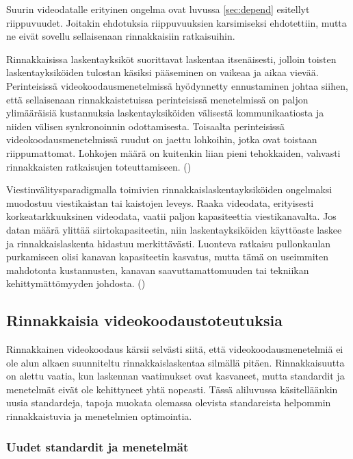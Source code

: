 Suurin videodatalle erityinen ongelma ovat luvussa \ref{sec:depend} esitellyt riippuvuudet.
Joitakin ehdotuksia riippuvuuksien
karsimiseksi ehdotettiin, mutta ne eivät sovellu sellaisenaan rinnakkaisiin
ratkaisuihin. 

Rinnakkaisissa laskentayksiköt suorittavat laskentaa itsenäisesti, jolloin
toisten laskentayksiköiden tulostan käsiksi pääseminen on vaikeaa ja
aikaa vievää. Perinteisissä videokoodausmenetelmissä hyödynnetty ennustaminen
johtaa siihen, että sellaisenaan rinnakkaistetuissa perinteisissä menetelmissä
on paljon ylimääräisiä kustannuksia laskentayksiköiden välisestä
kommunikaatiosta ja niiden välisen synkronoinnin odottamisesta. Toisaalta
perinteisissä videokoodausmenetelmissä ruudut on jaettu lohkoihin, jotka ovat
toistaan riippumattomat. Lohkojen määrä on kuitenkin liian pieni tehokkaiden,
vahvasti rinnakkaisten ratkaisujen toteuttamiseen. (\citealt{pieters})

Viestinvälitysparadigmalla toimivien rinnakkaislaskentayksiköiden ongelmaksi
muodostuu viestikaistan tai kaistojen leveys. Raaka videodata, erityisesti
korkeatarkkuuksinen videodata, vaatii paljon kapasiteettia viestikanavalta. Jos
datan määrä ylittää siirtokapasiteetin, niin laskentayksiköiden käyttöaste
laskee ja rinnakkaislaskenta hidastuu merkittävästi. Luonteva ratkaisu
pullonkaulan purkamiseen olisi kanavan kapasiteetin kasvatus, mutta tämä on
useimmiten mahdotonta kustannusten, kanavan saavuttamattomuuden tai tekniikan
kehittymättömyyden johdosta. (\citealt{li})

\subsection{Rinnakkaisia videokoodaustoteutuksia}

Rinnakkainen videokoodaus kärsii selvästi siitä, että
videokoodausmenetelmiä ei ole alun alkaen suunniteltu rinnakkaislaskentaa
silmällä pitäen. Rinnakkaisuutta on alettu vaatia, kun laskennan vaatimukset
ovat kasvaneet, mutta standardit ja menetelmät eivät ole kehittyneet
yhtä nopeasti. Tässä aliluvussa käsitelläänkin uusia standardeja, tapoja
muokata olemassa olevista standareista helpommin rinnakkaistuvia ja menetelmien
optimointia.

\subsubsection{Uudet standardit ja menetelmät}

